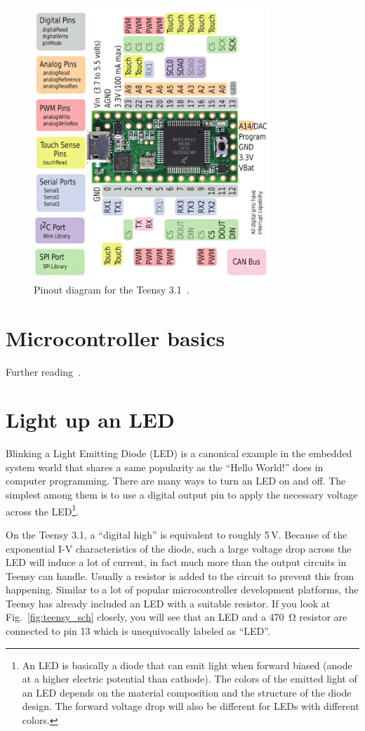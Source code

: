 \documentclass[letterpaper, 11pt]{article}
\begin{document}
\begin{figure}[ht]
	\centering
	\includegraphics[width=3.5in]{teensy_pinout.png}
	\caption{Pinout diagram for the Teensy 3.1~\cite{bib:teensy_pinout}.}
	\label{fig:teensy_pinout}
\end{figure}

\section{Microcontroller basics}

Further reading~\cite{bib:uC_intro}.

\section{Light up an LED}
Blinking a Light Emitting Diode (LED) is a canonical example in the embedded system world that shares a same popularity as the ``Hello World!'' does in computer programming. There are many ways to turn an LED on and off. The simplest among them is to use a digital output pin to apply the necessary voltage across the LED\footnote{An LED is basically a diode that can emit light when forward biased (anode at a higher electric potential than cathode). The colors of the emitted light of an LED depends on the material composition and the structure of the diode design. The forward voltage drop will also be different for LEDs with different colors.}. 

On the Teensy 3.1, a ``digital high'' is equivalent to roughly 5\,V. Because of the exponential I-V characteristics of the diode, such a large voltage drop across the LED will induce a lot of current, in fact much more than the output circuits in Teensy can handle. Usually a resistor is added to the circuit to prevent this from happening. Similar to a lot of popular microcontroller development platforms, the Teensy has already included an LED with a suitable resistor. If you look at Fig.~\ref{fig:teensy_sch} closely, you will see that an LED and a \SI{470}{\ohm} resistor are connected to pin 13 which is unequivocally labeled as ``LED''. 
\end{document}
